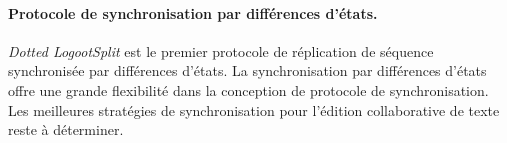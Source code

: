 \paragraph{Protocole de synchronisation par différences d'états.} \emph{Dotted LogootSplit} est le premier protocole de réplication de séquence synchronisée par différences d'états.
La synchronisation par différences d'états offre une grande flexibilité dans la conception de protocole de synchronisation.
Les meilleures stratégies de synchronisation pour l'édition collaborative de texte reste à déterminer.
